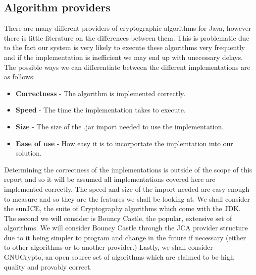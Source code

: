 \documentclass[12pt, titlepage]{article}
\begin{document}
\subsection{Algorithm providers}
There are many different providers of cryptographic algorithms for Java, however there is little literature on the differences between them. This is problematic due to the fact our system is very likely to execute these algorithms very frequently and if the implementation is inefficient we may end up with unecessary delays. The possible ways we can differentiate between the different implementations are as follows:
\begin{itemize}
	\item \textbf{Correctness} - The algorithm is implemented correctly.
	\item \textbf{Speed} - The time the implementation takes to execute.
	\item \textbf{Size} - The size of the .jar import needed to use the implementation.
	\item \textbf{Ease of use} - How easy it is to incorportate the implemtation into our solution.
\end{itemize}
Determining the correctness of the implementations is outside of the scope of this report and so it will be assumed all implementations covered here are implemented correctly. The speed and size of the import needed are easy enough to measure and so they are the features we shall be looking at.
\newline \indent We shall consider the sunJCE, the suite of Cryptography algorithms which come with the JDK. The second we will consider is Bouncy Castle, the popular, extensive set of algorithms. We will consider Bouncy Castle through the JCA provider structure due to it being simpler to program and change in the future if necessary (either to other algorithms or to another provider.) Lastly, we shall consider GNUCrypto, an open source set of algorithms which are claimed to be high quality and provably correct.
\end{document}
